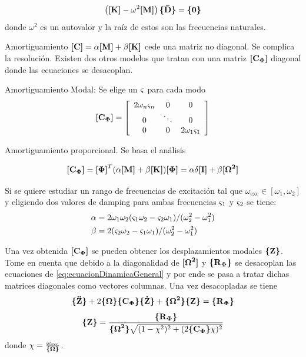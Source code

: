 \[
\left( \MK - \omega^2 \Mme{M} \right)\Cme{\boldsymbol{\bar{\mathrm D}}} = \Cme{0}
\]
donde $\omega^2$ es un autovalor y la raíz de estos son las frecuencias naturales.




Amortiguamiento $\Mme{C} = \alpha \Mme{M}+\beta \Mme{K}$ cede una matriz no diagonal. Se complica la resolución. Existen dos otros modelos que tratan con una matriz $\Mme{C\modal}$ diagonal donde las ecuaciones se desacoplan.


Amortiguamiento Modal: Se elige un $\dampfact$ para cada modo
\begin{equation}
\Mme{C\modal}=\left[ \begin{array}{ccc}{2 \omega_{n} \dampfact_{n}} & {0} & {0} \\ {0} & {\ddots} & {0} \\ {0} & {0} & {2 \omega_{1} \dampfact_{1}}\end{array}\right]
\end{equation}

Amortiguamiento proporcional. Se basa el análisis 

\begin{equation}
	\Mme{C\modal} = \Mme{\Phib}^T ( \alpha \Mme{M}+\beta \Mme{K})\Mme{\Phib} = \alpha \delta \Mme{I} +\beta \Mme{\Omegab^2}
\end{equation}

Si se quiere estudiar un rango de frecuencias de excitación tal que $\omega_{\mathrm{exc}}\in [\omega_1, \omega_2]$ y eligiendo dos valores de damping para ambas frecuencias $\dampfact_1$ y $\dampfact_2$ se tiene:
\begin{align*}
\alpha &= 2\omega_1 \omega_2 (\dampfact_1 \omega_2 -\dampfact_2 \omega_1)/(\omega_2^2 - \omega_1^2) \\ \beta &= 2(\dampfact_2\omega_2 -\dampfact_1 \omega_1)/(\omega_2^2 - \omega_1^2)
\end{align*}

Una vez obtenida $\Mme{C\modal}$ se pueden obtener los desplazamientos modales $\Cme{Z}$. Tome en cuenta que debido a la diagonalidad de $\Mme{\Omegab^2}$ y $\Cme{R\modal }$ se desacoplan las ecuaciones de \ref{eq:ecuacionDinamicaGeneral} y por ende se pasa a tratar dichas matrices diagonales como vectores columnas. Una vez desacopladas se tiene
 \[\Cme{\boldsymbol{\ddot{\mathrm{Z}}}}+2\COmega \Cme{C\modal} \Cme{\boldsymbol{\dot{\mathrm{Z}}}} + \Cme{\Omegab^2} \Cme{Z} = \Cme{R\modal} \]
\[
\Cme{Z} = \frac{\Cme{R\modal }}{ \Cme{\Omegab^2} \sqrt{(1-\chi^2)^2 + (2 \Cme{C\modal} \chi)^2}}
\]
donde $\chi = \frac{\omega_{\mathrm{exc}}}{\COmega}$. 



